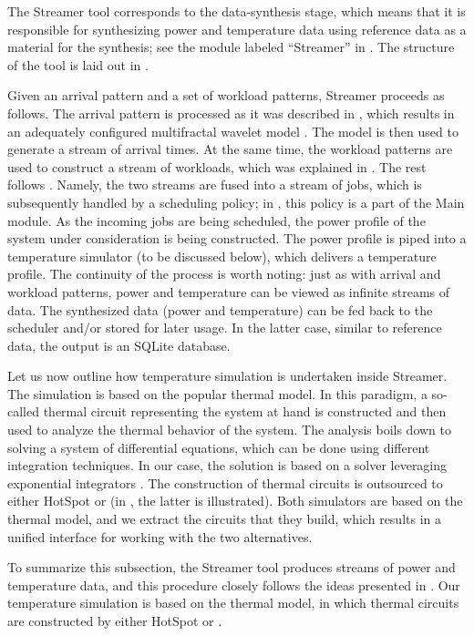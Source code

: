 
The Streamer tool corresponds to the data-synthesis stage, which means that it
is responsible for synthesizing power and temperature data using reference data
as a material for the synthesis; see the module labeled ``Streamer'' in
. The structure of the tool is laid out in .

Given an arrival pattern and a set of workload patterns, Streamer proceeds as
follows. The arrival pattern is processed as it was described in ,
which results in an adequately configured multifractal wavelet model
\cite{riedi1999}. The model is then used to generate a stream of arrival times.
At the same time, the workload patterns are used to construct a stream of
workloads, which was explained in . The rest follows
. Namely, the two streams are fused into a stream of jobs,
which is subsequently handled by a scheduling policy; in , this
policy is a part of the Main module. As the incoming jobs are being scheduled,
the power profile of the system under consideration is being constructed. The
power profile is piped into a temperature simulator (to be discussed below),
which delivers a temperature profile. The continuity of the process is worth
noting: just as with arrival and workload patterns, power and temperature can be
viewed as infinite streams of data. The synthesized data (power and temperature)
can be fed back to the scheduler and/or stored for later usage. In the latter
case, similar to reference data, the output is an SQLite database.

Let us now outline how temperature simulation is undertaken inside Streamer. The
simulation is based on the popular thermal  model. In this paradigm, a
so-called thermal  circuit representing the system at hand is constructed
and then used to analyze the thermal behavior of the system. The analysis boils
down to solving a system of differential equations, which can be done using
different integration techniques. In our case, the solution is based on a solver
leveraging exponential integrators \cite{hochbruck2010, ukhov2012}. The
construction of thermal circuits is outsourced to either HotSpot
\cite{skadron2004} or  \cite{sridhar2010} (in , the
latter is illustrated). Both simulators are based on the thermal  model,
and we extract the circuits that they build, which results in a unified
interface for working with the two alternatives.

To summarize this subsection, the Streamer tool produces streams of power and
temperature data, and this procedure closely follows the ideas presented in
. Our temperature simulation is based on the thermal 
model, in which thermal circuits are constructed by either HotSpot or
.
